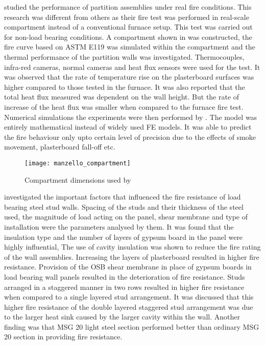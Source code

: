 \citet{Manzello2005} studied the performance of partition assemblies under real fire conditions. This research was different from others as their fire test was performed in real-scale compartment instead of a conventional furnace setup. This test was carried out for non-load bearing conditions. A compartment shown in  was constructed, the fire curve based on ASTM E119 was simulated within the compartment and the thermal performance of the partition walls was investigated. Thermocouples, infra-red cameras, normal cameras and heat flux sensors were used for the test. It was observed that the rate of temperature rise on the plasterboard surfaces was higher compared to those tested in the furnace. It was also reported that the total heat flux measured was dependent on the wall height. But the rate of increase of the heat flux was smaller when compared to the furnace fire test. Numerical simulations the experiments were then performed by \citet{Manzello2007}. The model was entirely mathematical instead of widely used FE models. It was able to predict the fire behaviour only upto certain level of precision due to the effects of smoke movement, plasterboard fall-off etc.
\begin{figure}[htbp]
	\centering
		\texttt{[image: manzello\_compartment]}		
		\caption{Compartment dimensions used by \citet{Manzello2005}}
			\label{fig:manzello_compartment}
	\end{figure}

\citet{Kodur2006} investigated the important factors that influenced the fire resistance of load bearing steel stud walls. Spacing of the studs and their thickness of the steel used, the magnitude of load acting on the panel, shear membrane and type of installation were the parameters analysed by them. It was found that the insulation type and the number of layers of gypsum board in the panel were highly influential, The use of cavity insulation was shown to reduce the fire rating of the wall assemblies. Increasing the layers of plasterboard resulted in higher fire resistance. Provision of the OSB shear membrane in place of gypsum boards in load bearing wall panels resulted in the deterioration of fire resistance. Studs arranged in a staggered manner in two rows resulted in higher fire resistance when compared to a single layered stud arrangement. It was discussed that this higher fire resistance of the double layered staggered stud arrangement was due to the larger heat sink caused by the larger cavity within the wall. Another finding was that MSG 20 light steel section performed better than ordinary MSG 20 section in providing fire resistance.


